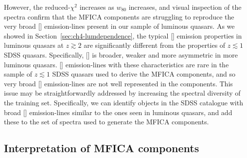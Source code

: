 However, the reduced-$\chi^2$ increases as $w_{80}$ increases, and visual inspection of the spectra confirm that the MFICA components are struggling to reproduce the very broad [] emission-lines present in our sample of luminous quasars.
As we showed in Section~\ref{sec:ch4-lumdependence}, the typical [] emission properties in luminous quasars at $z \gtrsim 2$ are significantly different from the properties of $z \lesssim 1$ SDSS quasars.
Specifically, [] is broader, weaker and more asymmetric in more luminous quasars.
[] emission-lines with these characteristics are rare in the sample of $z \lesssim 1$ SDSS quasars used to derive the MFICA components, and so very broad [] emission-lines are not well represented in the components.
This issue may be straightforwardly addressed by increasing the spectral diversity of the training set.
Specifically, we can identify objects in the SDSS catalogue with broad [] emission-lines similar to the ones seen in luminous quasars, and add these to the set of spectra used to generate the MFICA components.

\subsection{Interpretation of MFICA components}

